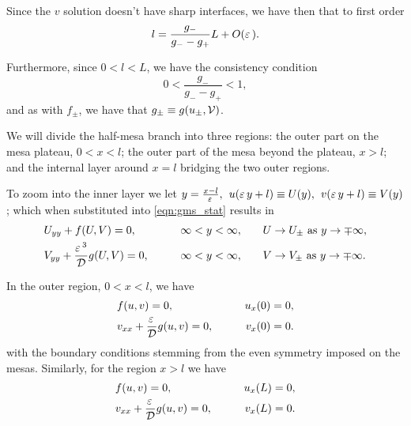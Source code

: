 Since the $v$ solution doesn't have sharp interfaces, we have then that to first order
% 
\begin{equation}
\label{eqn:l_eqn}
\begin{split}
  l = \frac{g_-}{g_- - g_+}L + O(\varepsilon\,).
\begin{aligned}
\end{aligned}
\end{split}
\end{equation}
% 

Furthermore, since $0<l<L$, we have the consistency condition
% 
\begin{equation*}
  0<\frac{g_-}{g_- - g_+}<1,
\end{equation*}
% 
and as with $f_{\pm}$, we have that $g_{\pm} \equiv g(u_{\pm},\mathcal{V})$.

We will divide the half-mesa branch into three regions: the outer part on the mesa plateau, $0<x<l$; the outer part of the mesa beyond the plateau, $x>l$; and the internal layer around $x=l$ bridging the two outer regions.

To zoom into the inner layer we let $y=\frac{x-l}{\varepsilon\,},\hspace{1ex} u(\varepsilon\, y+l)\equiv U(y),\hspace{1ex} v(\varepsilon\, y+l)\equiv V(y)$; which when substituted into \eqref{eqn:gms_stat} results in
% 
\begin{equation}
\label{eqn:gms_layer}
\begin{split}
\begin{aligned}
	&U_{yy}+ f(U,V) =0,\qquad &\infty<y<\infty,\qquad &U\rightarrow U_{\pm} \text{ as } y\rightarrow\mp\infty,\\
	&V_{yy}+ \frac{\varepsilon\,^3}{\mathcal{D}} g(U,V)=0,\qquad &\infty<y<\infty,\qquad &V\rightarrow V_{\pm} \text{ as } y\rightarrow\mp\infty.
\end{aligned}
\end{split}
\end{equation}
% 

In the outer region, $0<x<l$, we have
% 
\begin{equation*}
\begin{split}
\begin{aligned}
	&f(u,v) = 0,\qquad &u_x(0)=0,\\
	&v_{xx}+ \frac{\varepsilon\,}{\mathcal{D}} g(u,v) = 0,\qquad &v_x(0)=0.
\end{aligned}
\end{split}
\end{equation*}
% 
with the boundary conditions stemming from the even symmetry imposed on the mesas. Similarly, for the region $x>l$ we have
% 
\begin{equation}
\label{eqn:gms_outer2}
\begin{split}
\begin{aligned}
	&f(u,v) = 0,\qquad &u_x(L)=0,\\
	&v_{xx} + \frac{\varepsilon\,}{\mathcal{D}} g(u,v) = 0,\qquad &v_x(L)=0.
\end{aligned}
\end{split}
\end{equation}
% 

